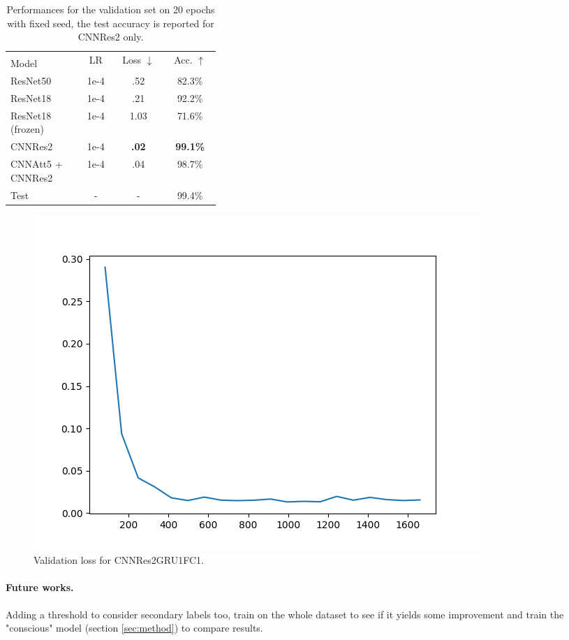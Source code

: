 \documentclass{article}
\begin{document}
\begin{table}
    \caption{Performances for the validation set on 20 epochs with fixed seed, the test accuracy is reported for CNNRes2 only.}
    \label{tab:joint-results}
    \begin{center}
        \begin{small}
            \begin{tabular}{p{0.35\linewidth} | ccc}
                \toprule
                & \multirow{2}{0.13\linewidth}{LR} 
                & \multirow{2}{0.13\linewidth}{Loss $\downarrow$} 
                & \multirow{2}{0.13\linewidth}{Acc. $\uparrow$} \\
                Model \\
                \midrule
                ResNet50 & 1e-4 & .52 & 82.3\% \\
                ResNet18 & 1e-4 & .21 & 92.2\% \\
                ResNet18 (frozen) & 1e-4 & 1.03 & 71.6\% \\
                CNNRes2 & 1e-4 & \textbf{.02} & \textbf{99.1\%} \\
                CNNAtt5 + CNNRes2 & 1e-4 & .04 & 98.7\% \\
                \midrule
                \midrule
                Test & - & - & 99.4\% \\
                \bottomrule
            \end{tabular}
        \end{small}
    \end{center}
    \vspace{-0.5cm}
\end{table}

\begin{figure}
    \centering
    \includegraphics[scale=.5]{images/val_loss.png}
    \caption{Validation loss for CNNRes2GRU1FC1.}
    \label{fig:val-loss}
\end{figure}

\paragraph*{Future works.}
Adding a threshold to consider secondary labels too, train on the whole dataset to see if it yields some improvement and train the "conscious" model (section \ref{sec:method}) to compare results.



\end{document}
